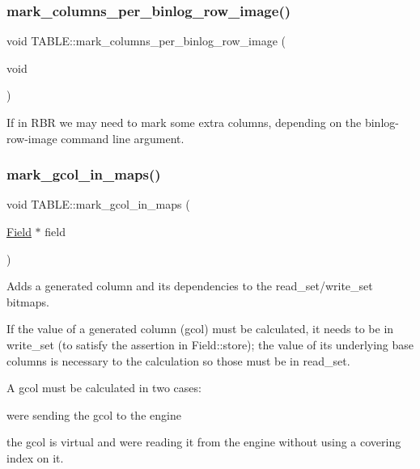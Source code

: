 \subsubsection{\texorpdfstring{mark\+\_\+columns\+\_\+per\+\_\+binlog\+\_\+row\+\_\+image()}{mark\_columns\_per\_binlog\_row\_image()}}
{\footnotesize\ttfamily void T\+A\+B\+L\+E\+::mark\+\_\+columns\+\_\+per\+\_\+binlog\+\_\+row\+\_\+image (\begin{DoxyParamCaption}\item[{void}]{ }\end{DoxyParamCaption})}

If in R\+BR we may need to mark some extra columns, depending on the binlog-\/row-\/image command line argument.\mbox{\label{structTABLE_a018e1c973c05f94e62c753e80559c1c1}} 
\subsubsection{\texorpdfstring{mark\+\_\+gcol\+\_\+in\+\_\+maps()}{mark\_gcol\_in\_maps()}}
{\footnotesize\ttfamily void T\+A\+B\+L\+E\+::mark\+\_\+gcol\+\_\+in\+\_\+maps (\begin{DoxyParamCaption}\item[{\mbox{\hyperlink{classField}{Field}} $\ast$}]{field }\end{DoxyParamCaption})}

Adds a generated column and its dependencies to the read\+\_\+set/write\+\_\+set bitmaps.

If the value of a generated column (gcol) must be calculated, it needs to be in write\+\_\+set (to satisfy the assertion in Field\+::store); the value of its underlying base columns is necessary to the calculation so those must be in read\+\_\+set.

A gcol must be calculated in two cases\+:
\begin{DoxyItemize}
\item we\textquotesingle{}re sending the gcol to the engine
\item the gcol is virtual and we\textquotesingle{}re reading it from the engine without using a covering index on it. 
\end{DoxyItemize}\mbox{\label{structTABLE_a2557166f01a25c157d4c16dd3305bddb}} 
